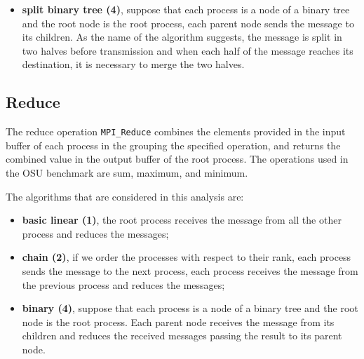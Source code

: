 \begin{itemize}
    \item \textbf{split binary tree (4)}, suppose that each process is a node of a binary tree and the root node is the root process, each parent node sends the message to its children. As the name of the algorithm suggests, the message is split in two halves before transmission and when each half of the message reaches its destination, it is necessary to merge the two halves.
    \begin{center}
    \end{center}

\end{itemize}


\subsection{Reduce}

The reduce operation \texttt{MPI\_Reduce} combines the elements provided in the input buffer of each process in the grouping the specified operation, and returns the combined value in the output buffer of the root process. The operations used in the OSU benchmark are sum, maximum, and minimum.

The algorithms that are considered in this analysis are:
\begin{itemize}
    \item \textbf{basic linear (1)}, the root process receives the message from all the other process and reduces the messages;
    \item \textbf{chain (2)}, if we order the processes with respect to their rank, each process sends the message to the next process, each process receives the message from the previous process and reduces the messages;
    \item \textbf{binary (4)}, suppose that each process is a node of a binary tree and the root node is the root process. Each parent node receives the message from its children and reduces the received messages passing the result to its parent node.
\end{itemize}